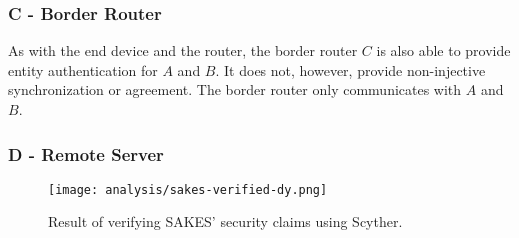 \subsubsection{C - Border Router}

As with the end device and the router, the border router $C$ is also able to provide entity authentication for $A$ and $B$. It does not, however, provide non-injective synchronization or agreement. The border router only communicates with $A$ and $B$.



\subsubsection{D - Remote Server}

\begin{figure}[h]
	\centering
	\texttt{[image: analysis/sakes-verified-dy.png]}
	\caption{Result of verifying SAKES' security claims using Scyther.}
	\label{fig:sakes-verified}
\end{figure}













